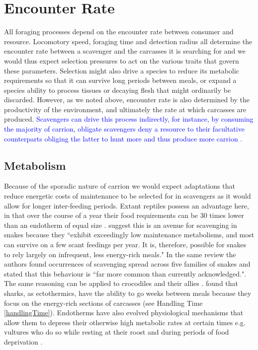 \documentclass[a4paper,12pt]{article}
\begin{document}
\section{Encounter Rate}
All foraging processes depend on the encounter rate between consumer and resource. 
Locomotory speed, foraging time and detection radius all determine the encounter rate between a scavenger and the carcasses it is searching for and we would thus expect selection pressures to act on the various traits that govern these parameters.
Selection might also drive a species to reduce its metabolic requirements so that it can survive long periods between meals, or expand a species ability to process tissues or decaying flesh that might ordinarily be discarded.
However, as we noted above, encounter rate is also determined by the productivity of the environment, and ultimately the rate at which carcasses are produced. 
\textcolor{blue}{Scavengers can drive this process indirectly, for instance, by consuming the majority of carrion, obligate scavengers deny a resource to their facultative counterparts obliging the latter to hunt more and thus produce more carrion \citep{moleon2014inter}.}

\subsection{Metabolism}
Because of the sporadic nature of carrion we would expect adaptations that reduce energetic costs of maintenance to be selected for in scavengers as it would allow for longer inter-feeding periods. 
Extant reptiles possess an advantage here, in that over the course of a year their food requirements can be 30 times lower than an endotherm of equal size \citep{Nagy1621}.
\cite{devault2002scavenging} suggest this is an avenue for scavenging in snakes because they ``exhibit exceedingly low maintenance metabolisms, and most can survive on a few scant feedings per year.
It is, therefore, possible for snakes to rely largely on infrequent, less energy-rich meals."
In the same review the authors found occurrences of scavenging spread across five families of snakes and stated that this behaviour is ``far more common than currently acknowledged."\citep{devault2002scavenging}.
The same reasoning can be applied to crocodiles and their allies \citep{forrest2003evidence,moleon2015carcass}. 
\cite{carey1982temperature} found that sharks, as ectothermics, have the ability to go weeks between meals because they focus on the energy-rich sections of carcasses (see Handling Time \ref{handlingTime}). 
Endotherms have also evolved physiological mechanisms that allow them to depress their otherwise high metabolic rates at certain times e.g. vultures who do so while resting at their roost and during periods of food deprivation \citep{bahat1998nocturnal}. 
\end{document}
